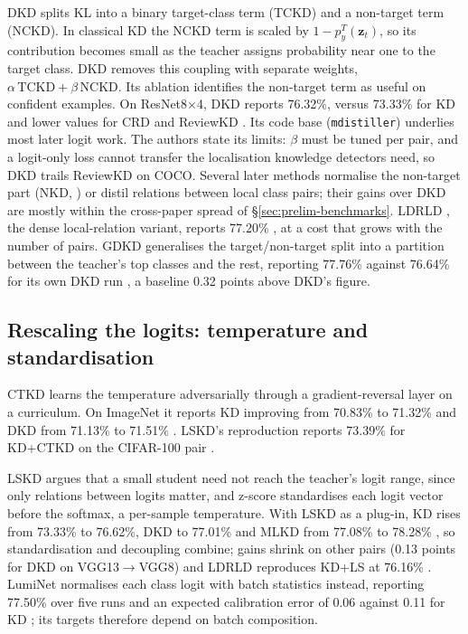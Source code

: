 DKD \citep{zhao2022dkd} splits KL into a binary target-class term (TCKD) and a non-target term (NCKD). In classical KD the NCKD term is scaled by $1-p^{T}_{y}(\mathbf{z}_t)$, so its contribution becomes small as the teacher assigns probability near one to the target class. DKD removes this coupling with separate weights, $\alpha\,\mathrm{TCKD}+\beta\,\mathrm{NCKD}$. Its ablation identifies the non-target term as useful on confident examples. On ResNet8$\times$4, DKD reports 76.32\%, versus 73.33\% for KD and lower values for CRD and ReviewKD \citep[Table~6]{zhao2022dkd}. Its code base (\texttt{mdistiller}) underlies most later logit work. The authors state its limits: $\beta$ must be tuned per pair, and a logit-only loss cannot transfer the localisation knowledge detectors need, so DKD trails ReviewKD on COCO.
Several later methods normalise the non-target part (NKD, \citealp{yang2023nkd}) or distil relations between local class pairs; their gains over DKD are mostly within the cross-paper spread of \S\ref{sec:prelim-benchmarks}. LDRLD \citep{xu2025ldrld}, the dense local-relation variant, reports 77.20\% \citep[Table~1]{xu2025ldrld}, at a cost that grows with the number of pairs.
GDKD \citep{zheng2025gdkd} generalises the target/non-target split into a partition between the teacher's top classes and the rest, reporting 77.76\% against 76.64\% for its own DKD run \citep[Table~I]{zheng2025gdkd}, a baseline 0.32 points above DKD's figure.

\subsection{Rescaling the logits: temperature and standardisation}
\label{sec:logit-scale}

CTKD \citep{li2023ctkd} learns the temperature adversarially through a gradient-reversal layer on a curriculum. On ImageNet it reports KD improving from 70.83\% to 71.32\% and DKD from 71.13\% to 71.51\% \citep[Table~4]{li2023ctkd}. LSKD's reproduction reports 73.39\% for KD+CTKD on the CIFAR-100 pair \citep[Table~2]{sun2024lskd}.

LSKD \citep{sun2024lskd} argues that a small student need not reach the teacher's logit range, since only relations between logits matter, and z-score standardises each logit vector before the softmax, a per-sample temperature. With LSKD as a plug-in, KD rises from 73.33\% to 76.62\%, DKD to 77.01\% and MLKD from 77.08\% to 78.28\% \citep[Table~2]{sun2024lskd}, so standardisation and decoupling combine; gains shrink on other pairs (0.13 points for DKD on VGG13$\to$VGG8) and LDRLD reproduces KD+LS at 76.16\% \citep[Table~1]{xu2025ldrld}.
LumiNet \citep{hossain2025luminet} normalises each class logit with batch statistics instead, reporting 77.50\% over five runs and an expected calibration error of 0.06 against 0.11 for KD \citep[Tables~1 and~5]{hossain2025luminet}; its targets therefore depend on batch composition.


